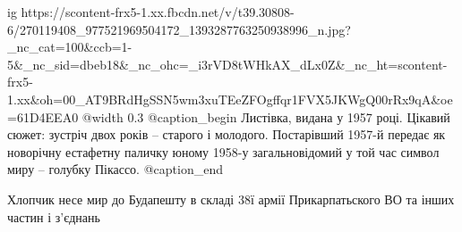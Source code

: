  
 
 
 
 

\ifcmt
  ig https://scontent-frx5-1.xx.fbcdn.net/v/t39.30808-6/270119408_977521969504172_1393287763250938996_n.jpg?_nc_cat=100&ccb=1-5&_nc_sid=dbeb18&_nc_ohc=_i3rVD8tWHkAX_dLx0Z&_nc_ht=scontent-frx5-1.xx&oh=00_AT9BRdHgSSN5wm3xuTEeZFOgffqr1FVX5JKWgQ00rRx9qA&oe=61D4EEA0
  @width 0.3
	@caption_begin
		Листівка, видана у 1957 році. Цікавий сюжет: зустріч двох років – старого і
		молодого. Постарівший 1957-й передає як новорічну естафетну паличку юному
		1958-у загальновідомий у той час символ миру – голубку Пікассо.
	@caption_end
\fi


Хлопчик несе мир до Будапешту в складі 38ї армії Прикарпатьского ВО та інших
частин і з'єднань
